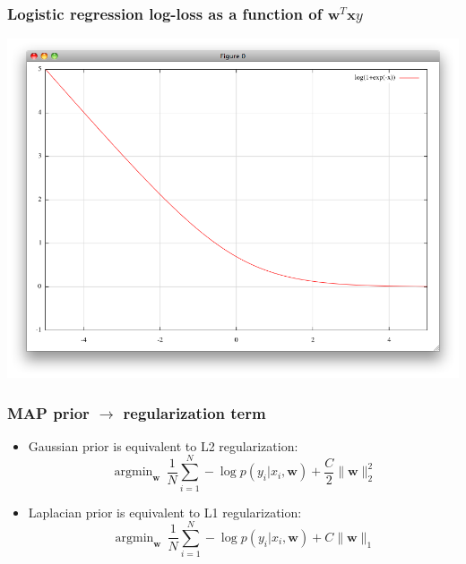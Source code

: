 \documentclass[ignorenonframetext,plain,fleqn]{beamer}
\DeclareMathOperator*{\argmin}{argmin}
\renewcommand{\vec}{\mathbf}
\begin{document}
\begin{frame}\frametitle{Logistic regression log-loss as a function of $\vec{w}^T\vec{x}y$}
\includegraphics[width=\textwidth]{images/log-loss.png}
\end{frame}

\begin{frame}\frametitle{MAP prior $\rightarrow$ regularization term}
\begin{itemize}
\item Gaussian prior is equivalent to L2 regularization: \[
  \argmin_\vec{w}\, \frac{1}{N} \sum_{i=1}^N -\log p(y_i|x_i,\vec{w}) + \frac{C}{2}\|\vec{w}\|_2^2
\]
\item Laplacian prior is equivalent to L1 regularization: \[
  \argmin_\vec{w}\, \frac{1}{N} \sum_{i=1}^N -\log p(y_i|x_i,\vec{w}) + C \|\vec{w}\|_1
\]
\end{itemize}
\end{frame}
\end{document}
